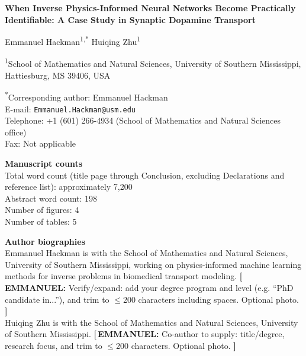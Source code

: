 \documentclass[12pt]{article}
\newcommand{\TODOi}[1]{\begingroup\color{red}\textbf{[\,EMMANUEL:\;} #1 \textbf{]}\endgroup}
\begin{document}
\begin{titlepage}
\thispagestyle{empty}

\begin{center}
{\LARGE\bfseries When Inverse Physics-Informed Neural Networks
Become Practically Identifiable: A Case Study in Synaptic
Dopamine Transport \par}
\end{center}

\vspace{1.5em}
\noindent Emmanuel Hackman\textsuperscript{1,*} \quad
Huiqing Zhu\textsuperscript{1}

\vspace{0.5em}
\noindent\textsuperscript{1}School of Mathematics and Natural
Sciences, University of Southern Mississippi, Hattiesburg,
MS 39406, USA

\vspace{0.5em}
\noindent\textsuperscript{*}Corresponding author:
Emmanuel Hackman \\
E-mail: \texttt{Emmanuel.Hackman@usm.edu} \\
Telephone: +1 (601) 266-4934 (School of Mathematics and Natural
Sciences office) \\
Fax: Not applicable

\vspace{1.5em}
\noindent\textbf{Manuscript counts} \\
Total word count (title page through Conclusion, excluding
Declarations and reference list): approximately 7{,}200 \\
Abstract word count: 198 \\
Number of figures: 4 \\
Number of tables: 5

\vspace{1.5em}
\noindent\textbf{Author biographies} \\[0.5em]
Emmanuel Hackman is with the School of Mathematics and Natural
Sciences, University of Southern Mississippi, working on
physics-informed machine learning methods for inverse problems
in biomedical transport modeling.
\TODOi{Verify/expand: add your degree program and level (e.g.
``PhD candidate in...''), and trim to $\leq$200 characters
including spaces. Optional photo.} \\[0.5em]
Huiqing Zhu is with the School of Mathematics and Natural
Sciences, University of Southern Mississippi.
\TODOi{Co-author to supply: title/degree, research focus, and
trim to $\leq$200 characters. Optional photo.}

\end{titlepage}
\end{document}
